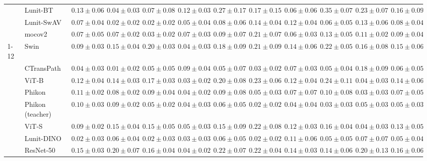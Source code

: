 \begin{tabular}{ll|cccc|c|cccc|c}
 & Lunit-BT & $0.13 \pm 0.06$ & $0.04 \pm 0.03$ & $0.07 \pm 0.08$ & $0.12 \pm 0.03$ & $0.27 \pm 0.17$ & $0.17 \pm 0.15$ & $0.06 \pm 0.06$ & $0.35 \pm 0.07$ & $0.23 \pm 0.07$ & $0.16 \pm 0.09$ \\
 & Lunit-SwAV & $0.07 \pm 0.04$ & $\mathbf{0.02 \pm 0.02}$ & $\mathbf{0.02 \pm 0.02}$ & $0.05 \pm 0.04$ & $0.08 \pm 0.06$ & $0.14 \pm 0.04$ & $0.12 \pm 0.04$ & $0.06 \pm 0.05$ & $0.13 \pm 0.06$ & $0.08 \pm 0.04$ \\
 & mocov2 & $0.07 \pm 0.05$ & $0.07 \pm 0.02$ & $0.03 \pm 0.02$ & $0.07 \pm 0.03$ & $0.09 \pm 0.07$ & $0.21 \pm 0.07$ & $0.06 \pm 0.03$ & $0.13 \pm 0.05$ & $0.11 \pm 0.02$ & $0.09 \pm 0.04$ \\
\cline{1-12}
\multirow[t]{12}{*}{Transformer} & Swin & $0.09 \pm 0.03$ & $0.15 \pm 0.04$ & $0.20 \pm 0.03$ & $0.04 \pm 0.03$ & $0.18 \pm 0.09$ & $0.21 \pm 0.09$ & $0.14 \pm 0.06$ & $0.22 \pm 0.05$ & $0.16 \pm 0.08$ & $0.15 \pm 0.06$ \\
 & CTransPath & $0.04 \pm 0.03$ & $\mathbf{0.01 \pm 0.02}$ & $0.05 \pm 0.05$ & $0.09 \pm 0.04$ & $\mathbf{0.05 \pm 0.07}$ & $0.03 \pm 0.02$ & $0.07 \pm 0.03$ & $0.05 \pm 0.04$ & $0.18 \pm 0.09$ & $0.06 \pm 0.05$ \\
 & ViT-B & $0.12 \pm 0.04$ & $0.14 \pm 0.03$ & $0.17 \pm 0.03$ & $0.03 \pm 0.02$ & $0.20 \pm 0.08$ & $0.23 \pm 0.06$ & $0.12 \pm 0.04$ & $0.24 \pm 0.11$ & $0.04 \pm 0.03$ & $0.14 \pm 0.06$ \\
 & Phikon & $0.11 \pm 0.02$ & $0.08 \pm 0.02$ & $0.09 \pm 0.04$ & $0.04 \pm 0.02$ & $0.09 \pm 0.08$ & $0.05 \pm 0.03$ & $0.07 \pm 0.07$ & $0.10 \pm 0.08$ & $\mathbf{0.03 \pm 0.03}$ & $0.07 \pm 0.05$ \\
 & Phikon (teacher) & $0.10 \pm 0.03$ & $0.09 \pm 0.02$ & $0.05 \pm 0.02$ & $0.04 \pm 0.03$ & $0.06 \pm 0.05$ & $0.02 \pm 0.02$ & $0.04 \pm 0.04$ & $\mathbf{0.03 \pm 0.03}$ & $0.05 \pm 0.03$ & $0.05 \pm 0.03$ \\
 & ViT-S & $0.09 \pm 0.02$ & $0.15 \pm 0.04$ & $0.15 \pm 0.05$ & $0.05 \pm 0.03$ & $0.15 \pm 0.09$ & $0.22 \pm 0.08$ & $0.12 \pm 0.03$ & $0.16 \pm 0.04$ & $0.04 \pm 0.03$ & $0.13 \pm 0.05$ \\
 & Lunit-DINO & $\mathbf{0.02 \pm 0.03}$ & $0.06 \pm 0.04$ & $\mathbf{0.02 \pm 0.03}$ & $\mathbf{0.03 \pm 0.03}$ & $0.06 \pm 0.05$ & $\mathbf{0.02 \pm 0.02}$ & $0.11 \pm 0.06$ & $0.05 \pm 0.05$ & $0.07 \pm 0.07$ & $\mathbf{0.05 \pm 0.04}$ \\
 & ResNet-50 & $0.15 \pm 0.03$ & $0.20 \pm 0.07$ & $0.16 \pm 0.04$ & $0.04 \pm 0.02$ & $0.22 \pm 0.07$ & $0.22 \pm 0.04$ & $0.14 \pm 0.03$ & $0.14 \pm 0.06$ & $0.20 \pm 0.13$ & $0.16 \pm 0.06$ \\

\end{tabular}
